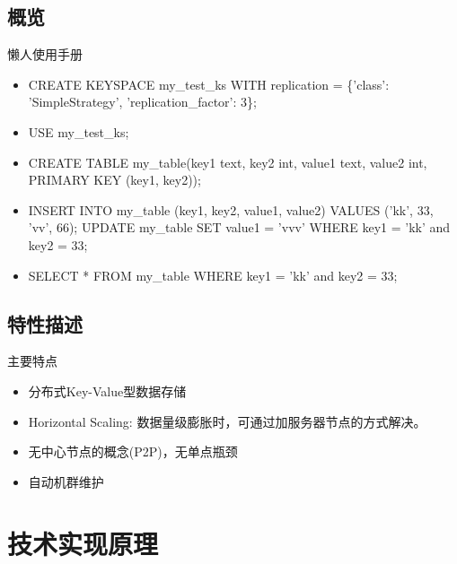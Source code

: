 \documentclass{beamer}
\begin{document}
\begin{CJK}{UTF8}{gbsn}
\subsection{概览}
\begin{frame}{懒人使用手册}
  \begin{itemize}
  \item {
      CREATE KEYSPACE my\_test\_ks WITH replication = \{'class': 'SimpleStrategy', 'replication\_factor': 3\};

      \pause
  }
  \item {
      USE my\_test\_ks;

      \pause
  }
  \item {
      CREATE TABLE my\_table(key1 text, key2 int, value1 text, value2 int, PRIMARY KEY (key1, key2));

      \pause
  }
  \item {
      INSERT INTO my\_table (key1, key2, value1, value2) VALUES ('kk', 33, 'vv', 66);
      UPDATE my\_table SET value1 = 'vvv' WHERE key1 = 'kk' and key2 = 33;

      \pause
  }
  \item {
      SELECT * FROM my\_table WHERE key1 = 'kk' and key2 = 33;
  }
  \end{itemize}
\end{frame}

\subsection{特性描述}
\begin{frame}{主要特点}
  \begin{itemize}
  \item {
      分布式Key-Value型数据存储
  }
  \pause
  \item {
      Horizontal Scaling: 数据量级膨胀时，可通过加服务器节点的方式解决。
  }
  \pause
  \item {
      无中心节点的概念(P2P)，无单点瓶颈
  }

  \pause
  \item {
      自动机群维护
  }
  \end{itemize}
\end{frame}

\section{技术实现原理}


\end{CJK}
\end{document}
